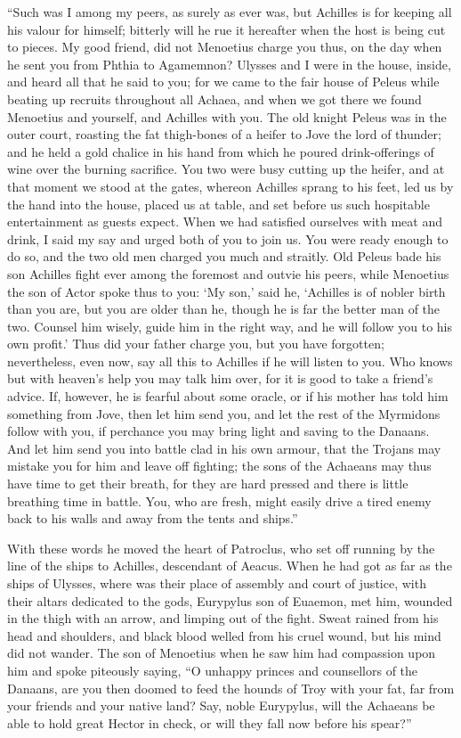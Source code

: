 “Such was I among my peers, as surely as ever was, but Achilles is for
keeping all his valour for himself; bitterly will he rue it hereafter when
the host is being cut to pieces. My good friend, did not Menoetius charge
you thus, on the day when he sent you from Phthia to Agamemnon? Ulysses
and I were in the house, inside, and heard all that he said to you; for we
came to the fair house of Peleus while beating up recruits throughout all
Achaea, and when we got there we found Menoetius and yourself, and
Achilles with you. The old knight Peleus was in the outer court, roasting
the fat thigh-bones of a heifer to Jove the lord of thunder; and he held a
gold chalice in his hand from which he poured drink-offerings of wine over
the burning sacrifice. You two were busy cutting up the heifer, and at
that moment we stood at the gates, whereon Achilles sprang to his feet,
led us by the hand into the house, placed us at table, and set before us
such hospitable entertainment as guests expect. When we had satisfied
ourselves with meat and drink, I said my say and urged both of you to join
us. You were ready enough to do so, and the two old men charged you much
and straitly. Old Peleus bade his son Achilles fight ever among the
foremost and outvie his peers, while Menoetius the son of Actor spoke thus
to you: ‘My son,’ said he, ‘Achilles is of nobler birth than you are, but
you are older than he, though he is far the better man of the two. Counsel
him wisely, guide him in the right way, and he will follow you to his own
profit.’ Thus did your father charge you, but you have forgotten;
nevertheless, even now, say all this to Achilles if he will listen to you.
Who knows but with heaven’s help you may talk him over, for it is good to
take a friend’s advice. If, however, he is fearful about some oracle, or
if his mother has told him something from Jove, then let him send you, and
let the rest of the Myrmidons follow with you, if perchance you may bring
light and saving to the Danaans. And let him send you into battle clad in
his own armour, that the Trojans may mistake you for him and leave off
fighting; the sons of the Achaeans may thus have time to get their breath,
for they are hard pressed and there is little breathing time in battle.
You, who are fresh, might easily drive a tired enemy back to his walls and
away from the tents and ships.”

With these words he moved the heart of Patroclus, who set off running by
the line of the ships to Achilles, descendant of Aeacus. When he had got
as far as the ships of Ulysses, where was their place of assembly and
court of justice, with their altars dedicated to the gods, Eurypylus son
of Euaemon, met him, wounded in the thigh with an arrow, and limping out
of the fight. Sweat rained from his head and shoulders, and black blood
welled from his cruel wound, but his mind did not wander. The son of
Menoetius when he saw him had compassion upon him and spoke piteously
saying, “O unhappy princes and counsellors of the Danaans, are you then
doomed to feed the hounds of Troy with your fat, far from your friends and
your native land? Say, noble Eurypylus, will the Achaeans be able to hold
great Hector in check, or will they fall now before his spear?”

